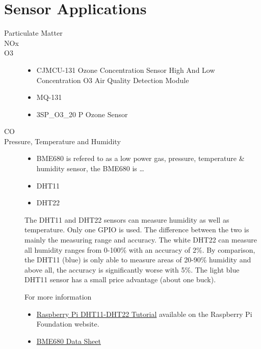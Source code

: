 \documentclass{article}\usepackage[]{graphicx}\usepackage[]{color}
\begin{document}
\section{Sensor Applications}

\begin{description}

\item[Particulate Matter]

\item[NOx]

\item[O3]

\begin{itemize}
  \item CJMCU-131 Ozone Concentration Sensor High And Low Concentration O3 Air Quality Detection Module
  \item MQ-131
  \item 3SP\_O3\_20 P Ozone Sensor
\end{itemize}

\item[CO]

\item[Pressure, Temperature and Humidity]

\begin{itemize}
  \item BME680 is refered to as a low power gas, pressure, temperature \& humidity sensor, the BME680 is \ldots
  \item DHT11
  \item DHT22
\end{itemize}

The DHT11 and DHT22 sensors can measure humidity as well as temperature. Only one GPIO is used. The difference between the two is mainly the measuring range and accuracy. The white DHT22 can measure all humidity ranges from 0-100\% with an accuracy of 2\%. By comparison, the DHT11 (blue) is only able to measure areas of 20-90\% humidity and above all, the accuracy is significantly worse with 5\%. The light blue DHT11 sensor has a small price advantage (about one buck).

For more information

\begin{itemize}
  \item \href{https://tutorials-raspberrypi.com/raspberry-pi-measure-humidity-temperature-dht11-dht22/}{Raspberry Pi DHT11-DHT22 Tutorial} available on the Raspberry Pi Foundation website.
  \item \href{https://cdn-shop.adafruit.com/product-files/3660/BME680.pdf}{BME680 Data Sheet}
\end{itemize}


\end{description}
\end{document}
